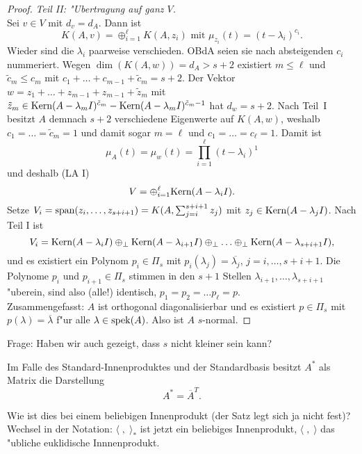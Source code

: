 \begin{proof}
{\em Teil II: "Ubertragung auf ganz $V$.} \\
Sei $v \in V$ mit $d_v = d_A$. Dann ist
\[
K(A,v) = \oplus_{i=1}^\ell K(A,z_i) \mbox{ mit } \mu_{z_i}(t) = (t-\lambda_i)^{c_i}.
\]
Wieder sind die $\lambda_i$ paarweise verschieden. OBdA seien sie nach absteigenden
$c_i$ nummeriert. Wegen $\dim(K(A,w)) = d_A > s+2$ existiert $m \leq \ell$ und $\tilde{c}_m
\leq c_m$ mit $c_1+\ldots + c_{m-1} + \tilde{c}_m = s+2$. Der Vektor $w = z_1 + \ldots +z_{m-1}
+ z_{m-1} + \tilde{z}_m$ mit $\tilde{z}_m \in \mbox{Kern}(A-\lambda_m I)^{\tilde{c}_m} - 
\mbox{Kern}(A-\lambda_m I)^{\tilde{c}_m-1} $ hat $d_w = s+2$. Nach Teil~I besitzt $A$ 
demnach $s+2$
verschiedene Eigenwerte auf $K(A,w)$, weshalb $c_1 = \ldots = \tilde{c}_m=1$ und damit
sogar $m=\ell$ und $c_1 = \ldots = c_\ell = 1$. Damit ist
\[
\mu_A(t) = \mu_w(t)  = \prod_{i=1}^\ell (t-\lambda_i)^1
\]
und deshalb (LA I)
\[
V = \oplus_{i=1}^\ell \mbox{Kern} (A - \lambda_i I).
\]
Setze $V_i = \operatorname{span}(z_i,\ldots,z_{s+i+1}) = K(A,\sum_{j=i}^{s+i+1} z_j)$
mit $z_j \in \mbox{Kern}(A-\lambda_j I)$. Nach Teil I ist
\[
V_i = \mbox{Kern}(A-\lambda_i I) \oplus_\perp \mbox{Kern}(A-\lambda_{i+1} I) \oplus_\perp 
         \ldots \oplus_\perp \mbox{Kern}(A-\lambda_{s+i+1} I),
\]
und es existiert ein Polynom $p_i \in \Pi_{s}$ mit $p_i(\lambda_j) = \overline{\lambda_j},
\, j=i,\ldots,s+i+1$. Die Polynome $p_i$ und $p_{i+1} \in \Pi_s$ stimmen in den $s+1$ Stellen $\lambda_{i+1}, \ldots, \lambda_{s+i+1}$ "uberein, sind also (alle!) identisch, $p_1=p_2
= \ldots p_\ell = p$.
\\
Zusammengefasst: $A$ ist orthogonal diagonalisierbar und es existiert $p \in \Pi_s$ mit $p(\lambda) = 
\overline{\lambda}$ f"ur alle $\lambda \in \operatorname{spek}(A)$. Also ist $A$ $s$-normal.
\end{proof}
\medskip

Frage: Haben wir auch gezeigt, dass $s$ nicht kleiner sein kann?
\medskip

Im Falle des Standard-Innenproduktes und der Standardbasis 
besitzt $A^*$ als Matrix die Darstellung
\[
A^* = \overline{A}^T.
\]

Wie ist dies bei einem beliebigen Innenprodukt (der Satz legt sich ja
nicht fest)? \\
Wechsel in der Notation: $\langle \; , \; \rangle_*$ ist jetzt ein beliebiges
Innenprodukt, $\langle \; , \; \rangle$ das "ubliche euklidische Innnenprodukt.

